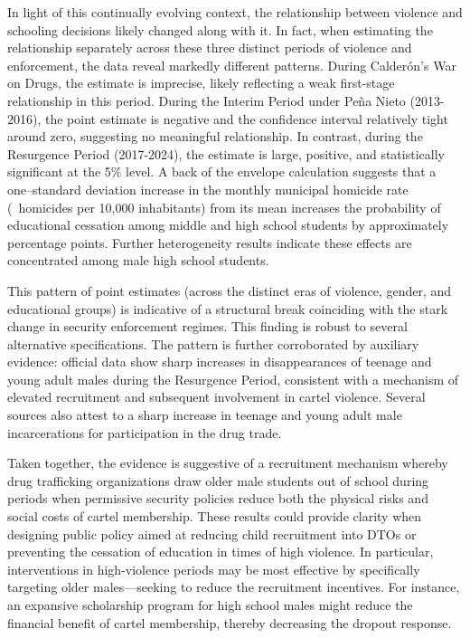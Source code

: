 \documentclass[12pt,letter,english,intoc,bibliography=totoc,index=totoc,BCOR10mm,captions=tableheading,nottitlepage,fleqn]{article}
\theoremstyle{break}
\begin{document}
In light of this continually evolving context, the relationship between violence and schooling decisions likely changed along with it. In fact, when estimating the relationship separately across these three distinct periods of violence and enforcement, the data reveal markedly different patterns. During Calder\'{o}n's War on Drugs, the estimate is imprecise, likely reflecting a weak first-stage relationship in this period. During the Interim Period under Pe\~{n}a Nieto (2013-2016), the point estimate is negative and the confidence interval relatively tight around zero, suggesting no meaningful relationship. In contrast, during the Resurgence Period (2017-2024), the estimate is large, positive, and statistically significant at the 5\% level. A back of the envelope calculation suggests that a one--standard deviation increase in the monthly municipal homicide rate (\MunicipalHRSD\ homicides per 10,000 inhabitants) from its mean increases the probability of educational cessation among middle and high school students by approximately {} percentage points. Further heterogeneity results indicate these effects are concentrated among male high school students. 

This pattern of point estimates (across the distinct eras of violence, gender, and educational groups) is indicative of a structural break coinciding with the stark change in security enforcement regimes. This finding is robust to several alternative specifications. The pattern is further corroborated by auxiliary evidence: official data show sharp increases in disappearances of teenage and young adult males during the Resurgence Period, consistent with a mechanism of elevated recruitment and subsequent involvement in cartel violence. Several sources also attest to a sharp increase in teenage and young adult male incarcerations for participation in the drug trade. 

Taken together, the evidence is suggestive of a recruitment mechanism whereby drug trafficking organizations draw older male students out of school during periods when permissive security policies reduce both the physical risks and social costs of cartel membership.  These results could provide clarity when designing public policy aimed at reducing child recruitment into DTOs or preventing the cessation of education in times of high violence. In particular, interventions in high-violence periods may be most effective by specifically targeting older males---seeking to reduce the recruitment incentives. For instance, an expansive scholarship program for high school males might reduce the financial benefit of cartel membership, thereby decreasing the dropout response. 
\end{document}
